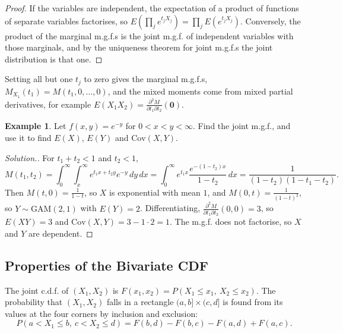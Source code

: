 \documentclass[12pt,a4paper]{report}
\theoremstyle{definition}
\newtheorem{example}[thm]{Example}
\theoremstyle{plain}
\newenvironment{solution}
  {\renewcommand{\qedsymbol}{}\begin{proof}[\textit{Solution}.]}
  {\end{proof}}
\begin{document}
\begin{proof}
If the variables are independent, the expectation of a product of functions of
separate variables factorises, so
$E\left(\prod_je^{t_jX_j}\right) = \prod_jE\left(e^{t_jX_j}\right)$. Conversely,
the product of the marginal m.g.f.s is the joint m.g.f. of independent variables
with those marginals, and by the uniqueness theorem for joint m.g.f.s the joint
distribution is that one.
\end{proof}

Setting all but one $t_j$ to zero gives the marginal m.g.f.s,
$M_{X_1}(t_1) = M(t_1,0,\dots,0)$, and the mixed moments come from mixed partial
derivatives, for example $E(X_1X_2) = \frac{\partial^2 M}{\partial
t_1\partial t_2}(\mathbf 0)$.

\begin{example}
\label{ex:jointmgf}
Let $f(x,y) = e^{-y}$ for $0<x<y<\infty$. Find the joint m.g.f., and use it to
find $E(X)$, $E(Y)$ and $\text{Cov}(X,Y)$.
\end{example}

\begin{solution}
For $t_1 + t_2<1$ and $t_2<1$,
\[M(t_1,t_2) = \int_0^\infty\int_x^\infty e^{t_1x + t_2y}e^{-y}\,dy\,dx =
\int_0^\infty e^{t_1x}\frac{e^{-(1 - t_2)x}}{1 - t_2}\,dx = \frac{1}{(1 -
t_2)(1 - t_1 - t_2)} .\]
Then $M(t,0) = \frac{1}{1 - t}$, so $X$ is exponential with mean $1$, and
$M(0,t) = \frac{1}{(1 - t)^2}$, so $Y\sim\text{GAM}(2,1)$ with $E(Y) = 2$.
Differentiating, $\frac{\partial^2M}{\partial t_1\partial t_2}(0,0) = 3$, so
$E(XY) = 3$ and $\text{Cov}(X,Y) = 3 - 1\cdot 2 = 1$. The m.g.f. does not
factorise, so $X$ and $Y$ are dependent.
\end{solution}

\subsection{Properties of the Bivariate CDF}

The joint c.d.f. of $(X_1,X_2)$ is $F(x_1,x_2) = P(X_1\leq x_1,\ X_2\leq x_2)$.
The probability that $(X_1, X_2)$ falls in a rectangle $(a,b] \times (c,d]$ is
found from its values at the four corners by inclusion and exclusion:
\[ P(a < X_1 \leq b,\ c < X_2 \leq d) = F(b,d) - F(b,c) - F(a,d) + F(a,c).\]
\end{document}
